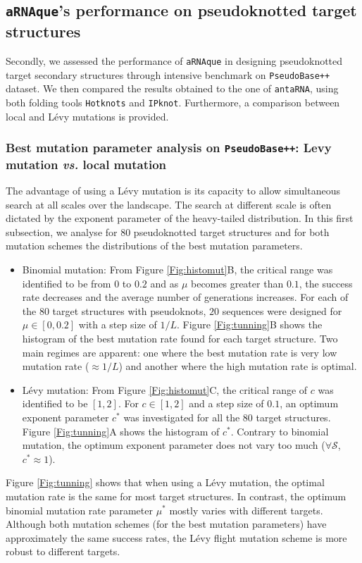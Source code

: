 \subsection{\texttt{aRNAque}'s performance on pseudoknotted target structures }
Secondly, we assessed the performance of \texttt{aRNAque} in designing pseudoknotted target secondary structures through intensive benchmark on \texttt{PseudoBase++} dataset. We then compared the results obtained to the one of \texttt{antaRNA}, using both folding tools \texttt{Hotknots} and \texttt{IPknot}. Furthermore, a comparison between local and Lévy mutations is provided.
\subsubsection{Best mutation parameter analysis on \texttt{PseudoBase++}: Levy mutation \emph{vs.} local mutation}
The advantage of using a Lévy mutation is its capacity to allow simultaneous search at all scales over the landscape. The search at different scale is often dictated by the exponent parameter of the heavy-tailed distribution. In this first subsection, we analyse for $80$ pseudoknotted target structures and for both mutation schemes the distributions of the best mutation parameters.
\begin{itemize}
	\item Binomial mutation: From Figure \ref{Fig:histomut}B, the critical range was identified to be from $0$ to $0.2$ and as $\mu$ becomes greater than $0.1$, the success rate decreases and the average number of generations increases. For each of the $80$ target structures with pseudoknots, $20$ sequences were designed for $\mu \in [0,0.2]$ with a step size of $1/L$. Figure \ref{Fig:tunning}B shows the histogram of the best mutation rate found for each target structure. Two main regimes are apparent: one where the best mutation rate is very low mutation rate ($\approx 1/L$) and another where the high mutation rate is optimal.
	
	\item Lévy mutation: From Figure \ref{Fig:histomut}C, the critical range of $c$ was identified to be $[1,2]$. For $c \in [1,2]$ and a step size of $0.1$, an optimum exponent parameter $c^*$ was investigated for all the $80$ target structures. Figure \ref{Fig:tunning}A shows the histogram of $c^*$. Contrary to binomial mutation, the optimum exponent parameter does not vary too much ($\forall \mathcal{S}$, $c^*\approx 1$).
\end{itemize}
Figure \ref{Fig:tunning} shows that when using a Lévy mutation, the optimal mutation rate is the same for most target structures. In contrast, the optimum binomial mutation rate parameter $\mu^*$ mostly varies with different targets. Although both mutation schemes (for the best mutation parameters) have approximately the same success rates, the Lévy flight mutation scheme is more robust to different targets. %

